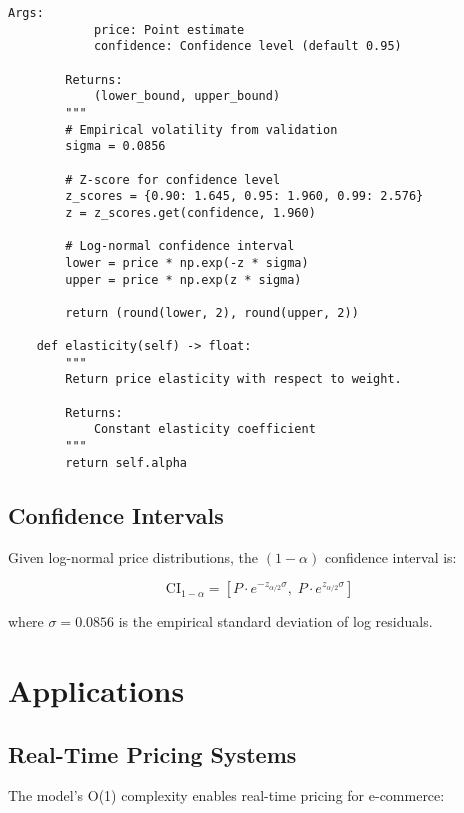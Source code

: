 \documentclass[12pt,a4paper]{article}
\begin{document}
\begin{lstlisting}[caption={Python Implementation of Alwadhi Power-Law},label={lst:implementation}]
        Args:
            price: Point estimate
            confidence: Confidence level (default 0.95)
            
        Returns:
            (lower_bound, upper_bound)
        """
        # Empirical volatility from validation
        sigma = 0.0856
        
        # Z-score for confidence level
        z_scores = {0.90: 1.645, 0.95: 1.960, 0.99: 2.576}
        z = z_scores.get(confidence, 1.960)
        
        # Log-normal confidence interval
        lower = price * np.exp(-z * sigma)
        upper = price * np.exp(z * sigma)
        
        return (round(lower, 2), round(upper, 2))
    
    def elasticity(self) -> float:
        """
        Return price elasticity with respect to weight.
        
        Returns:
            Constant elasticity coefficient
        """
        return self.alpha
\end{lstlisting}

\subsection{Confidence Intervals}

Given log-normal price distributions, the $(1-\alpha)$ confidence interval is:

\begin{equation}
\text{CI}_{1-\alpha} = \left[ P \cdot e^{-z_{\alpha/2} \sigma}, \; P \cdot e^{z_{\alpha/2} \sigma} \right]
\end{equation}

where $\sigma = 0.0856$ is the empirical standard deviation of log residuals.

\section{Applications}
\label{sec:applications}

\subsection{Real-Time Pricing Systems}

The model's O(1) complexity enables real-time pricing for e-commerce:
\end{document}
